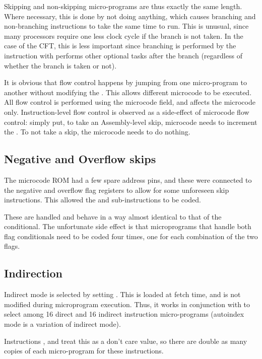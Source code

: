 Skipping and non-skipping micro-programs are thus exactly the same
length. Where necessary, this is done by not doing anything, which
causes branching and non-branching instructions to take the same time
to run. This is unusual, since many processors require one less clock
cycle if the branch is not taken. In the case of the CFT, this is less
important since branching is performed by the  instruction
with performs other optional tasks after the branch (regardless of
whether the branch is taken or not).

It is obvious that flow control happens by jumping from one
micro-program to another without modifying the \UPC{}. This allows
different microcode to be executed. All flow control is performed
using the \OPIF{} microcode field, and affects the microcode
only. Instruction-level flow control is observed as a side-effect of
microcode flow control: simply put, to take an Assembly-level skip,
microcode needs to increment the \PC{}. To not take a skip, the
microcode needs to do nothing.

\subsection{Negative and Overflow skips}

The microcode ROM had a few spare address pins, and these were
connected to the negative and overflow flag registers to allow for
some unforeseen skip instructions. This allowed the  and
 sub-instructions to be coded.

These are handled and behave in a way almost identical to that of the
 conditional. The unfortunate side effect is that
microprograms that handle both flag conditionals need to be coded four
times, one for each combination of the two flags.

\subsection{Indirection}

Indirect mode is selected by setting . This is loaded at fetch
time, and is not modified during microprogram execution. Thus, it
works in conjunction with  to select among 16 direct and 16
indirect instruction micro-programs (autoindex mode is a variation of
indirect mode).

Instructions ,  and  treat this as a don't
care value, so there are double as many copies of each micro-program
for these instructions.

